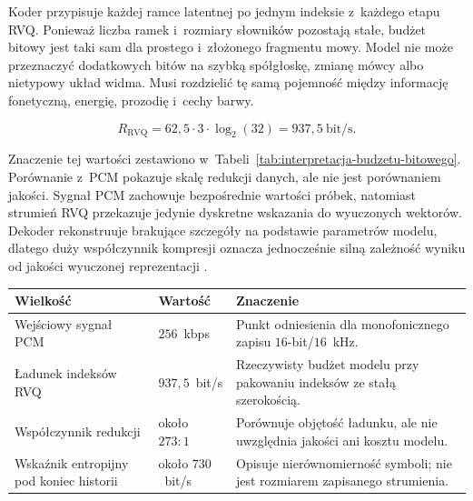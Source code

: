 Koder przypisuje każdej ramce latentnej po jednym indeksie z~każdego etapu RVQ. Ponieważ liczba ramek i~rozmiary słowników pozostają stałe, budżet bitowy jest taki sam dla prostego i~złożonego fragmentu mowy. Model nie może przeznaczyć dodatkowych bitów na szybką spółgłoskę, zmianę mówcy albo nietypowy układ widma. Musi rozdzielić tę samą pojemność między informację fonetyczną, energię, prozodię i~cechy barwy.

\begin{equation}
    R_{\mathrm{RVQ}} = 62{,}5 \cdot 3 \cdot \log_2(32)
    = 937{,}5~\mathrm{bit/s}.
    \label{eq:przeplywnosc-wariantu-eksperymentalnego}
\end{equation}

Znaczenie tej wartości zestawiono w~Tabeli~\ref{tab:interpretacja-budzetu-bitowego}. Porównanie z~PCM pokazuje skalę redukcji danych, ale nie jest porównaniem jakości. Sygnał PCM zachowuje bezpośrednie wartości próbek, natomiast strumień RVQ przekazuje jedynie dyskretne wskazania do wyuczonych wektorów. Dekoder rekonstruuje brakujące szczegóły na podstawie parametrów modelu, dlatego duży współczynnik kompresji oznacza jednocześnie silną zależność wyniku od jakości wyuczonej reprezentacji \cite{Zeghidour2021SoundStream,Defossez2022Encodec}.

\begin{center}
\centering
\small
\begin{tabular}{>{\raggedright\arraybackslash}p{} >{\raggedright\arraybackslash}p{} >{\raggedright\arraybackslash}p{}}
\toprule
Wielkość & Wartość & Znaczenie \\
\midrule
Wejściowy sygnał PCM & \(256\)~kbps & Punkt odniesienia dla monofonicznego zapisu \(16\)-bit/\(16\)~kHz. \\
Ładunek indeksów RVQ & \(937{,}5\)~bit/s & Rzeczywisty budżet modelu przy pakowaniu indeksów ze stałą szerokością. \\
Współczynnik redukcji & około \(273{:}1\) & Porównuje objętość ładunku, ale nie uwzględnia jakości ani kosztu modelu. \\
Wskaźnik entropijny pod koniec historii & około \(730\)~bit/s & Opisuje nierównomierność symboli; nie jest rozmiarem zapisanego strumienia. \\
\bottomrule
\end{tabular}
\label{tab:interpretacja-budzetu-bitowego}
\end{center}

